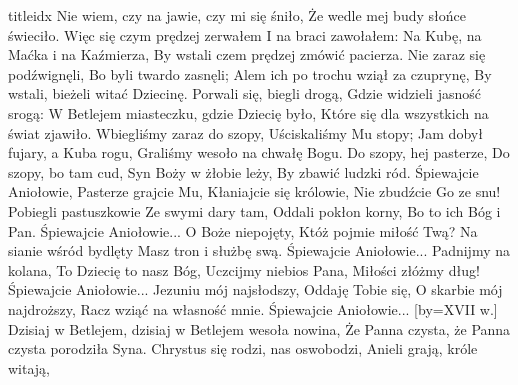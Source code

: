 \documentclass[a5paper, portrait, 12pt]{mwart}
\begin{document}
\begin{songs}{titleidx}
      Nie wiem, czy na jawie, czy mi się śniło,
      Że wedle mej budy słońce świeciło. 
  \endchorus
\beginverse
    Więc się czym prędzej zerwałem
    I na braci zawołałem:
\endverse
  \beginchorus
      Na Kubę, na Maćka i na Kaźmierza,
      By wstali czem prędzej zmówić pacierza.
  \endchorus
\beginverse
    Nie zaraz się podźwignęli,
    Bo byli twardo zasnęli;
\endverse
  \beginchorus
      Alem ich po trochu wziął za czuprynę,
      By wstali, bieżeli witać Dziecinę.
  \endchorus
\beginverse
    Porwali się, biegli drogą,
    Gdzie widzieli jasność srogą:
\endverse
  \beginchorus
      W Betlejem miasteczku, gdzie Dziecię było,
      Które się dla wszystkich na świat zjawiło.
  \endchorus
\beginverse
    Wbiegliśmy zaraz do szopy,
    Uściskaliśmy Mu stopy;
\endverse
  \beginchorus
      Jam dobył fujary, a Kuba rogu,
      Graliśmy wesoło na chwałę Bogu.
  \endchorus
\endsong
\beginverse
    Do szopy, hej pasterze,
    Do szopy, bo tam cud,
    Syn Boży w żłobie leży,
    By zbawić ludzki ród.
\endverse
\beginchorus
        Śpiewajcie Aniołowie,
        Pasterze grajcie Mu,
        Kłaniajcie się królowie,
        Nie zbudźcie Go ze snu!
\endchorus
\beginverse
    Pobiegli pastuszkowie
    Ze swymi dary tam,
    Oddali pokłon korny,
    Bo to ich Bóg i Pan.
\endverse
\beginchorus
        Śpiewajcie Aniołowie...
\endchorus
\beginverse
    O Boże niepojęty,
    Któż pojmie miłość Twą?
    Na sianie wśród bydlęty
    Masz tron i służbę swą.
\endverse
\beginchorus
        Śpiewajcie Aniołowie...
\endchorus
\beginverse
    Padnijmy na kolana,
    To Dziecię to nasz Bóg,
    Uczcijmy niebios Pana,
    Miłości złóżmy dług!
\endverse
\beginchorus
        Śpiewajcie Aniołowie...
\endchorus
\beginverse
    Jezuniu mój najsłodszy,
    Oddaję Tobie się,
    O skarbie mój najdroższy,
    Racz wziąć na własność mnie.
\endverse
\beginchorus
        Śpiewajcie Aniołowie...
\endchorus
\endsong
[by={XVII w.}]
\beginverse
    Dzisiaj w Betlejem, dzisiaj w Betlejem wesoła nowina,
    Że Panna czysta, że Panna czysta porodziła Syna.
\endverse
\beginchorus
    Chrystus się rodzi, nas oswobodzi,
    Anieli grają, króle witają,

\end{songs}
\end{document}

